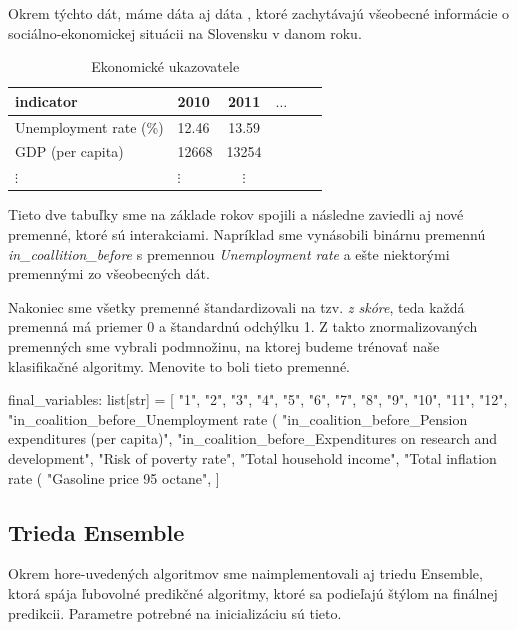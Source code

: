 \documentclass[main.tex]{subfiles}
\begin{document}
Okrem týchto  dát, máme dáta aj dáta , ktoré zachytávajú všeobecné informácie o sociálno-ekonomickej situácii na Slovensku v danom roku. 


\begin{table}[h!]
    \centering
    \caption{Ekonomické ukazovatele}
    \begin{tabular}{llcccl}
        \toprule
        \textbf{indicator} & \textbf{2010} & \textbf{2011} & $\ldots$ \\
        \midrule
        Unemployment rate (\%) & 12.46    & 13.59  \\
        GDP (per capita)       & 12668    & 13254 \\
        $\vdots$               & $\vdots$ & $\vdots$ \\ 
        \bottomrule
    \end{tabular}
\end{table}

Tieto dve tabuľky sme na základe rokov spojili a následne zaviedli aj nové premenné, ktoré sú interakciami. Napríklad sme vynásobili binárnu premennú \textit{in\_coallition\_before} s premennou \textit{Unemployment rate} a ešte niektorými premennými zo všeobecných dát.

Nakoniec sme všetky premenné štandardizovali na tzv. \textit{z skóre}, teda každá premenná má priemer 0 a štandardnú odchýlku 1. Z takto znormalizovaných premenných sme vybrali podmnožinu, na ktorej budeme trénovať naše klasifikačné algoritmy. Menovite to boli tieto premenné.

\begin{python}
    final_variables: list[str] = [
        "1", "2", "3", "4", "5", "6", "7", "8", "9", "10", "11", "12",
        "in_coalition_before_Unemployment rate (%
        "in_coalition_before_Pension expenditures (per capita)",
        "in_coalition_before_Expenditures on research and development",
        "Risk of poverty rate", "Total household income", "Total inflation rate (%
        "Gasoline price 95 octane",
    ]
\end{python}

\subsection{Trieda Ensemble}
Okrem hore-uvedených algoritmov sme naimplementovali aj triedu Ensemble, ktorá spája ľubovolné predikčné algoritmy, ktoré sa podieľajú štýlom  na finálnej predikcii. 
Parametre potrebné na inicializáciu sú tieto.
\end{document}
